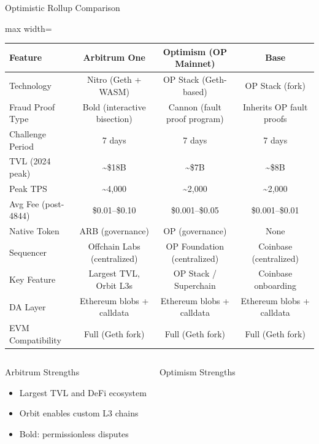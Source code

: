\documentclass[8pt,aspectratio=169]{beamer}
\begin{document}
\begin{frame}{Optimistic Rollup Comparison}
\vspace{2mm}
\begin{adjustbox}{max width=\textwidth}
\begin{tabular}{lccc}
\toprule
\textbf{Feature} & \textbf{Arbitrum One} & \textbf{Optimism (OP Mainnet)} & \textbf{Base} \\
\midrule
Technology & Nitro (Geth + WASM) & OP Stack (Geth-based) & OP Stack (fork) \\
Fraud Proof Type & Bold (interactive bisection) & Cannon (fault proof program) & Inherits OP fault proofs \\
Challenge Period & 7 days & 7 days & 7 days \\
TVL (2024 peak) & \textasciitilde\$18B & \textasciitilde\$7B & \textasciitilde\$8B \\
Peak TPS & \textasciitilde4{,}000 & \textasciitilde2{,}000 & \textasciitilde2{,}000 \\
Avg Fee (post-4844) & \$0.01--\$0.10 & \$0.001--\$0.05 & \$0.001--\$0.01 \\
Native Token & ARB (governance) & OP (governance) & None \\
Sequencer & Offchain Labs (centralized) & OP Foundation (centralized) & Coinbase (centralized) \\
Key Feature & Largest TVL, Orbit L3s & OP Stack / Superchain & Coinbase onboarding \\
DA Layer & Ethereum blobs + calldata & Ethereum blobs + calldata & Ethereum blobs + calldata \\
EVM Compatibility & Full (Geth fork) & Full (Geth fork) & Full (Geth fork) \\
\bottomrule
\end{tabular}
\end{adjustbox}
\vspace{4mm}
\begin{columns}[T]
\begin{block}{\footnotesize Arbitrum Strengths}
\scriptsize
\begin{itemize}
  \item Largest TVL and DeFi ecosystem
  \item Orbit enables custom L3 chains
  \item Bold: permissionless disputes
\end{itemize}
\end{block}
\begin{block}{\footnotesize Optimism Strengths}

\end{block}
\end{columns}
\end{frame}
\end{document}
